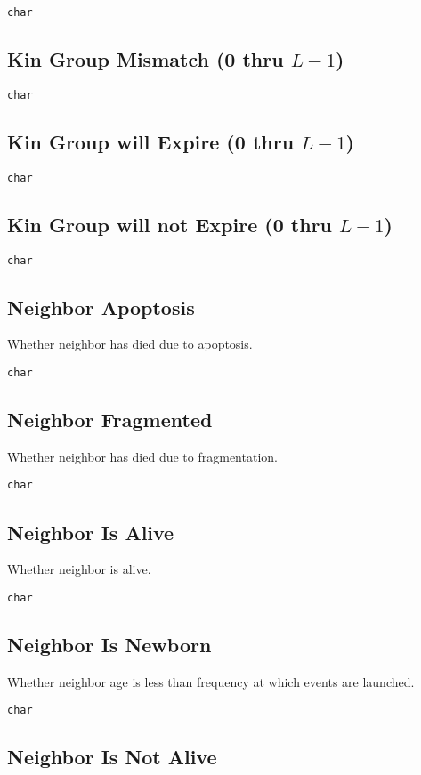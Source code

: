 \texttt{char}

\subsection{Kin Group Mismatch (0 thru $L-1$)}

\texttt{char}

\subsection{Kin Group will Expire (0 thru $L-1$)}

\texttt{char}

\subsection{Kin Group will not Expire (0 thru $L-1$)}

\texttt{char}

\subsection{Neighbor Apoptosis}

Whether neighbor has died due to apoptosis.

\texttt{char}

\subsection{Neighbor Fragmented}

Whether neighbor has died due to fragmentation.

\texttt{char}

\subsection{Neighbor Is Alive}

Whether neighbor is alive.

\texttt{char}

\subsection{Neighbor Is Newborn}

Whether neighbor age is less than frequency at which events are launched.

\texttt{char}

\subsection{Neighbor Is Not Alive}

